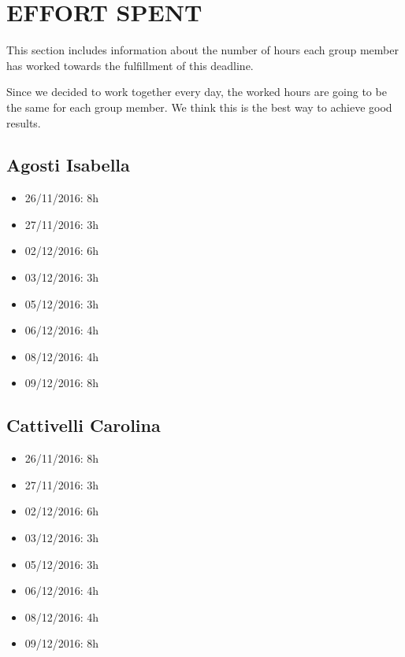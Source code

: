 \section{EFFORT  SPENT}  
This section includes information about the number of hours each group member has worked towards the fulfillment of this deadline. 

Since we decided to work together every day, the worked hours are going to be the same for each group member. We think this is the best way to achieve good results.  
\subsection{Agosti Isabella}
\begin{itemize}
	\item 26/11/2016: 8h
	\item 27/11/2016: 3h
	\item 02/12/2016: 6h
	\item 03/12/2016: 3h
	\item 05/12/2016: 3h
	\item 06/12/2016: 4h
	\item 08/12/2016: 4h
	\item 09/12/2016: 8h
\end{itemize}
\subsection{Cattivelli Carolina}
\begin{itemize}
	\item 26/11/2016: 8h
	\item 27/11/2016: 3h
	\item 02/12/2016: 6h
	\item 03/12/2016: 3h
	\item 05/12/2016: 3h
	\item 06/12/2016: 4h
	\item 08/12/2016: 4h
	\item 09/12/2016: 8h
\end{itemize}